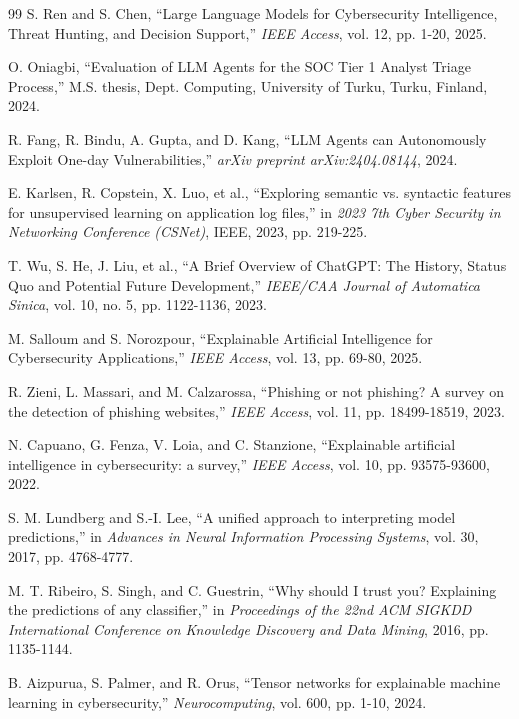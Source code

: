 \documentclass[12pt,a4paper]{report}
\begin{document}
\begin{thebibliography}{99}
 S. Ren and S. Chen, ``Large Language Models for Cybersecurity Intelligence, Threat Hunting, and Decision Support,'' \textit{IEEE Access}, vol. 12, pp. 1-20, 2025.

 O. Oniagbi, ``Evaluation of LLM Agents for the SOC Tier 1 Analyst Triage Process,'' M.S. thesis, Dept. Computing, University of Turku, Turku, Finland, 2024.

 R. Fang, R. Bindu, A. Gupta, and D. Kang, ``LLM Agents can Autonomously Exploit One-day Vulnerabilities,'' \textit{arXiv preprint arXiv:2404.08144}, 2024.

 E. Karlsen, R. Copstein, X. Luo, et al., ``Exploring semantic vs. syntactic features for unsupervised learning on application log files,'' in \textit{2023 7th Cyber Security in Networking Conference (CSNet)}, IEEE, 2023, pp. 219-225.

 T. Wu, S. He, J. Liu, et al., ``A Brief Overview of ChatGPT: The History, Status Quo and Potential Future Development,'' \textit{IEEE/CAA Journal of Automatica Sinica}, vol. 10, no. 5, pp. 1122-1136, 2023.

 M. Salloum and S. Norozpour, ``Explainable Artificial Intelligence for Cybersecurity Applications,'' \textit{IEEE Access}, vol. 13, pp. 69-80, 2025.

 R. Zieni, L. Massari, and M. Calzarossa, ``Phishing or not phishing? A survey on the detection of phishing websites,'' \textit{IEEE Access}, vol. 11, pp. 18499-18519, 2023.

 N. Capuano, G. Fenza, V. Loia, and C. Stanzione, ``Explainable artificial intelligence in cybersecurity: a survey,'' \textit{IEEE Access}, vol. 10, pp. 93575-93600, 2022.

 S. M. Lundberg and S.-I. Lee, ``A unified approach to interpreting model predictions,'' in \textit{Advances in Neural Information Processing Systems}, vol. 30, 2017, pp. 4768-4777.

 M. T. Ribeiro, S. Singh, and C. Guestrin, ``Why should I trust you? Explaining the predictions of any classifier,'' in \textit{Proceedings of the 22nd ACM SIGKDD International Conference on Knowledge Discovery and Data Mining}, 2016, pp. 1135-1144.

 B. Aizpurua, S. Palmer, and R. Orus, ``Tensor networks for explainable machine learning in cybersecurity,'' \textit{Neurocomputing}, vol. 600, pp. 1-10, 2024.


\end{thebibliography}
\end{document}
